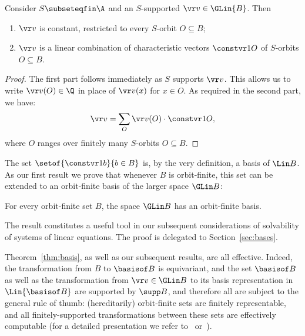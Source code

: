 \begin{lemma} \label{lem:1O}
Consider $S\subseteqfin \A$ and an $S$-supported $\vr v \in \GLin {B}$. Then
\begin{enumerate}
\item[(i)] $\vr v$ is constant, restricted to every $S$-orbit $O\subseteq B$;
\item[(ii)] $\vr v$ is a linear combination of characteristic vectors $\constvr 1 O$ of $S$-orbits $O\subseteq B$.
\end{enumerate}
\end{lemma}
%
\begin{proof}
%
The first part follows immediately as $S$ supports ${\vr v}$.
This allows us to write
$\vr v(O) \in \Q$ in place of $\vr v(x)$ for  $x \in O$. 
As required in the second part, we have:
\begin{align} \label{eq:1O}
\vr v = \sum_O \vr v(O) \cdot \constvr 1 O,
\end{align}
where $O$ ranges over finitely many %
$S$-orbits $O\subseteq B$. 
\end{proof}
%


The set $\setof{\constvr 1 b}{b\in B}$ is, by the very definition, a basis of $\Lin B$.
As our first result we prove that whenever $B$ is orbit-finite, this set can be extended to
an orbit-finite basis of the larger space $\GLin B$:
%
\begin{theorem}\label{thm:basis}
For every orbit-finite set $B$, the space $\GLin B$ has an orbit-finite basis.%
\end{theorem}
%
The result constitutes a useful tool in our subsequent considerations of solvability of systems of linear equations.
The proof is delegated to Section~\ref{sec:bases}.

\begin{slremark} \label{rem:effect}
Theorem~\ref{thm:basis}, as well as our subsequent results, are all effective.
Indeed,
the transformation from $B$ to $\basisof B$ is equivariant,
and the set $\basisof B$ as well as  
the transformation from $\vr v\in \GLin B$ to its basis representation in $\Lin{\basisof B}$ are
supported by $\supp B$, 
and therefore all are subject to the general rule of thumb: 
(hereditarily) orbit-finite sets are finitely representable, and
all finitely-supported transformations between these sets are effectively computable
(for a detailed presentation we refer to~\cite{program-atoms} or~\cite[Sect.~4,8,9]{atombook}).
\end{slremark}

